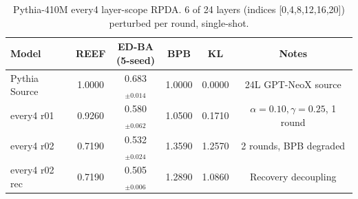 \begin{table}[t]
\centering
\caption{Pythia-410M every4 layer-scope RPDA. 6 of 24 layers (indices [0,4,8,12,16,20]) perturbed per round, single-shot.}
\label{tab:pythia_every4}
\small
\begin{tabular}{lccccc}
\toprule
Model & REEF & \thead{ED-BA\\(5-seed)} & BPB & KL & Notes \\
\midrule
  Pythia Source & 1.0000 & 0.683$_{\pm0.014}$ & 1.0000 & 0.0000 & 24L GPT-NeoX source \\
  every4 r01 & 0.9260 & 0.580$_{\pm0.062}$ & 1.0500 & 0.1710 & $\alpha{=}0.10,\gamma{=}0.25$, 1 round \\
  every4 r02 & 0.7190 & 0.532$_{\pm0.024}$ & 1.3590 & 1.2570 & 2 rounds, BPB degraded \\
  every4 r02 rec & 0.7190 & 0.505$_{\pm0.006}$ & 1.2890 & 1.0860 & Recovery decoupling \\
\bottomrule
\end{tabular}
\end{table}